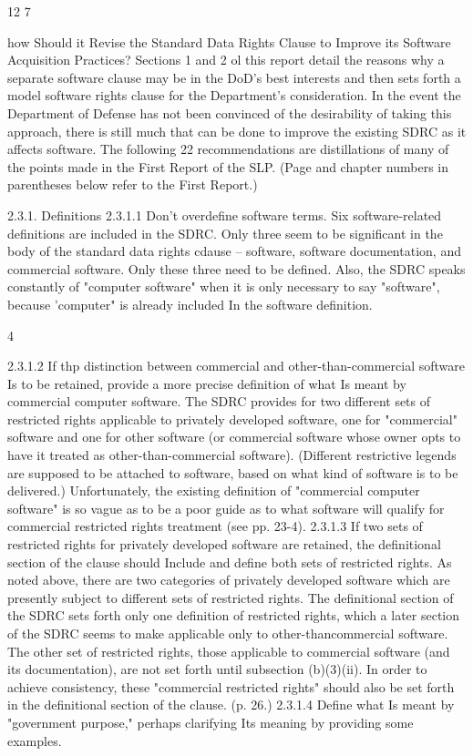 \documentclass[12pt]{article}
\begin{document}
12
7

how Should it Revise the Standard Data Rights Clause to
Improve its Software Acquisition Practices?
Sections 1 and 2 ol this report detail the reasons why a separate software clause may be in the
DoD's best interests and then sets forth a model software rights clause for the Department's consideration. In the event the Department of Defense has not been convinced of the desirability of
taking this approach, there is still much that can be done to improve the existing SDRC as it affects
software. The following 22 recommendations are distillations of many of the points made in the First
Report of the SLP. (Page and chapter numbers in parentheses below refer to the First Report.)

2.3.1. Definitions
2.3.1.1 Don't overdefine software terms.
Six software-related definitions are included in the SDRC. Only three seem to be significant in the
body of the standard data rights cdause -- software, software documentation, and commercial software. Only these three need to be defined. Also, the SDRC speaks constantly of "computer
software" when it is only necessary to say "software", because 'computer" is already included In the
software definition.

4

2.3.1.2 If thp distinction between commercial and other-than-commercial software Is to be
retained, provide a more precise definition of what Is meant by commercial computer
software.
The SDRC provides for two different sets of restricted rights applicable to privately developed software, one for "commercial" software and one for other software (or commercial software whose
owner opts to have it treated as other-than-commercial software). (Different restrictive legends are
supposed to be attached to software, based on what kind of software is to be delivered.) Unfortunately, the existing definition of "commercial computer software" is so vague as to be a poor guide
as to what software will qualify for commercial restricted rights treatment (see pp. 23-4).
2.3.1.3 If two sets of restricted rights for privately developed software are retained, the definitional section of the clause should Include and define both sets of restricted rights.
As noted above, there are two categories of privately developed software which are presently subject
to different sets of restricted rights. The definitional section of the SDRC sets forth only one definition
of restricted rights, which a later section of the SDRC seems to make applicable only to other-thancommercial software. The other set of restricted rights, those applicable to commercial software (and
its documentation), are not set forth until subsection (b)(3)(ii). In order to achieve consistency, these
"commercial restricted rights" should also be set forth in the definitional section of the clause. (p. 26.)
2.3.1.4 Define what Is meant by "government purpose," perhaps clarifying Its meaning by
providing some examples.
\end{document}
